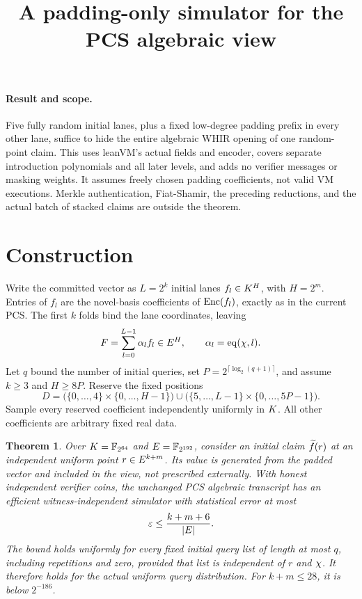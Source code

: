 \documentclass[11pt]{article}
\title{A padding-only simulator for the PCS algebraic view}
\author{}
\date{}
\newtheorem{theorem}{Theorem}
\begin{document}
\maketitle
\vspace{-2em}

\paragraph{Result and scope.} Five fully random initial lanes, plus a fixed low-degree padding prefix in every other lane, suffice to hide the entire algebraic WHIR opening of one random-point claim. This uses leanVM's actual fields and encoder, covers separate introduction polynomials and all later levels, and adds no verifier messages or masking weights. It assumes freely chosen padding coefficients, not valid VM executions. Merkle authentication, Fiat-Shamir, the preceding reductions, and the actual batch of stacked claims are outside the theorem.

\section{Construction}

Write the committed vector as $L=2^k$ initial lanes $f_l\in K^H$, with $H=2^m$. Entries of $f_l$ are the novel-basis coefficients of $\mathrm{Enc}(f_l)$, exactly as in the current PCS. The first $k$ folds bind the lane coordinates, leaving
\[
 F=\sum_{l=0}^{L-1}\alpha_l f_l\in E^H,
 \qquad \alpha_l=\operatorname{eq}(\chi,l).
\]
Let $q$ bound the number of initial queries, set $P=2^{\lceil\log_2(q+1)\rceil}$, and assume $k\ge3$ and $H\ge8P$. Reserve the fixed positions
\[
 D=\bigl(\{0,\ldots,4\}\times\{0,\ldots,H-1\}\bigr)
 \cup\bigl(\{5,\ldots,L-1\}\times\{0,\ldots,5P-1\}\bigr).
\]
Sample every reserved coefficient independently uniformly in $K$. All other coefficients are arbitrary fixed real data.

\begin{theorem}\label{thm:pcs-padding}
Over $K=\mathbb{F}_{2^{64}}$ and $E=\mathbb{F}_{2^{192}}$, consider an initial claim $\widetilde{f}(r)$ at an independent uniform point $r\in E^{k+m}$. Its value is generated from the padded vector and included in the view, not prescribed externally. With honest independent verifier coins, the unchanged PCS algebraic transcript has an efficient witness-independent simulator with statistical error at most
\[
 \varepsilon\le \frac{k+m+6}{|E|}.
\]
The bound holds uniformly for every fixed initial query list of length at most $q$, including repetitions and zero, provided that list is independent of $r$ and $\chi$. It therefore holds for the actual uniform query distribution. For $k+m\le28$, it is below $2^{-186}$.
\end{theorem}
\end{document}
